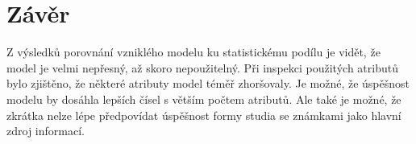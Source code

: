 \documentclass[12pt, letterpaper]{article}
\begin{document}
\section{Závěr}
Z výsledků porovnání vzniklého modelu ku statistickému podílu je vidět, že model je velmi nepřesný, až skoro 
nepoužitelný. Při inspekci použitých atributů bylo zjištěno, že některé atributy model téměř zhoršovaly. Je možné, že
úspěšnost modelu by dosáhla lepších čísel s větším počtem atributů. Ale také je možné, že zkrátka nelze lépe
předpovídat úspěšnost formy studia se známkami jako hlavní zdroj informací.
\end{document}
